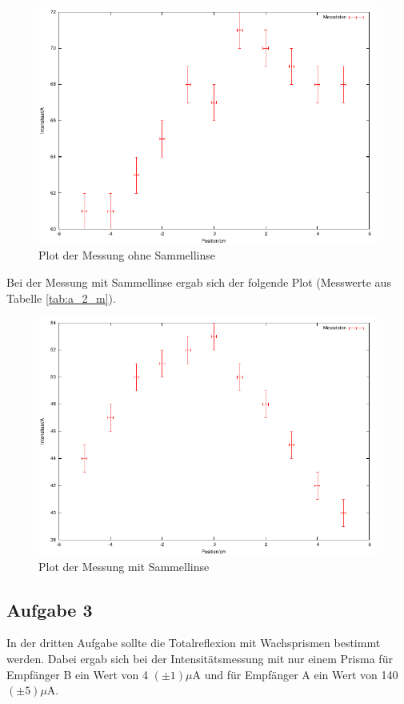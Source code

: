 \documentclass[12pt]{scrartcl}
\begin{document}
\begin{figure}[H]
\centering
    \includegraphics[scale = 1]{a_2_o.pdf}
  	\caption[Plot der Messung ohne Sammellinse]{Plot der Messung ohne Sammellinse}
  \label{fig:a_2_o}
\end{figure}

Bei der Messung mit Sammellinse ergab sich der folgende Plot (Messwerte aus Tabelle \ref{tab:a_2_m}).


\begin{figure}[H]
\centering
    \includegraphics[scale = 1]{a_2_m.pdf}
  	\caption[Plot der Messung mit Sammellinse]{Plot der Messung mit Sammellinse}
  \label{fig:a_2_m}
\end{figure}



\subsection{Aufgabe 3}
In der dritten Aufgabe sollte die Totalreflexion mit Wachsprismen bestimmt werden.
Dabei ergab sich bei der Intensitätsmessung mit nur einem Prisma  für Empfänger B ein Wert von 4 $(\pm 1) \mu$A und für Empfänger A ein Wert von 140 $(\pm 5) \mu$A.
\end{document}

